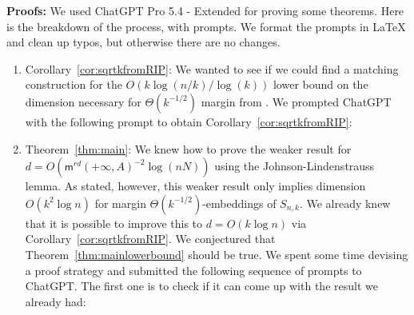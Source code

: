 \documentclass[preprint]{article}
\newcommand{\maxmargin}{\mathsf{m}^{rd}}
\newcommand{\ksparsen}{S_{n,k}}
\begin{document}
\textbf{Proofs:} We used ChatGPT Pro 5.4 - Extended for proving some theorems. Here is the breakdown of the process, with prompts. We format the prompts in LaTeX and clean up typos, but otherwise there are no changes.     
\begin{enumerate}
    \item Corollary~\ref{cor:sqrtkfromRIP}: We wanted to see if we could find a matching construction for the $O(k\log(n/k)/\log(k))$ lower bound on the dimension necessary for $\Theta(k^{-1/2})$ margin from \cite{weller2025theoretical}. We prompted ChatGPT with the following prompt to obtain Corollary~\ref{cor:sqrtkfromRIP}:
    \medskip
    
    
    \medskip
    
    \item Theorem~\ref{thm:main}: We knew how to prove the weaker result for $d = O(\maxmargin(+\infty, A)^{-2}\log(nN))$ using the Johnson-Lindenstrauss lemma. As stated, however, this weaker result only implies dimension $O(k^2\log n)$ for margin $\Theta(k^{-1/2})$-embeddings of $\ksparsen.$ We already knew that it is possible to improve this to $d= O(k\log n)$ via Corollary~\ref{cor:sqrtkfromRIP}. We conjectured that Theorem~\ref{thm:mainlowerbound} should be true. We spent some time devising a proof strategy and submitted the following sequence of prompts to ChatGPT. The first one is to check if it can come up with the result we already had:
        
    \medskip
    
\end{enumerate}
\end{document}
